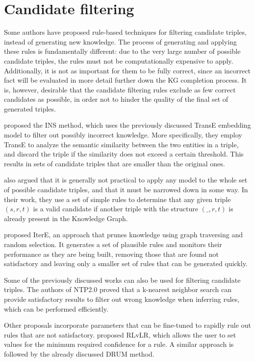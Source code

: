 \section{Candidate filtering}\label{sec:rule-cands}
Some authors have proposed rule-based techniques for filtering candidate triples, instead of generating new knowledge. The process of generating and applying these rules is fundamentally different: due to the very large number of possible candidate triples, the rules must not be computationally expensive to apply. Additionally, it is not as important for them to be fully correct, since an incorrect fact will be evaluated in more detail further down the KG completion process. It is, however, desirable that the candidate filtering rules exclude as few correct candidates as possible, in order not to hinder the quality of the final set of generated triples.

\citet{wei2015} proposed the INS method, which uses the previously discussed TransE embedding model to filter out possibly incorrect knowledge. More specifically, they employ TransE to analyze the semantic similarity between the two entities in a triple, and discard the triple if the similarity does not exceed a certain threshold. This results in sets of candidate triples that are smaller than the original ones.

\citet{shi18} also argued that it is generally not practical to apply any model to the whole set of possible candidate triples, and that it must be narrowed down in some way. In their work, they use a set of simple rules to determine that any given triple $(s, r, t)$ is a valid candidate if another triple with the structure $(\_, r, t)$ is already present in the Knowledge Graph.

\citet{zhang2019} proposed IterE, an approach that prunes knowledge using graph traversing and random selection. It generates a set of plausible rules and monitors their performance as they are being built, removing those that are found not satisfactory and leaving only a smaller set of rules that can be generated quickly.

Some of the previously discussed works can also be used for filtering candidate triples. The authors of NTP2.0 \cite{minervini2018} proved that a k-nearest neighbor search can provide satisfactory results to filter out wrong knowledge when inferring rules, which can be performed efficiently.

Other proposals incorporate parameters that can be fine-tuned to rapidly rule out rules that are not satisfactory. \citet{omran2018} proposed RLvLR, which allows the user to set values for the minimum required confidence for a rule. A similar approach is followed by the already discussed DRUM \cite{sadeghian2019} method.


